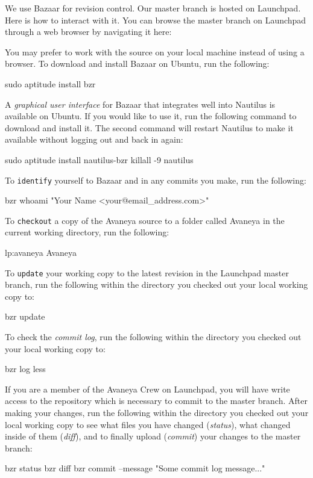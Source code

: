 
We use Bazaar for revision control. Our master branch is hosted on Launchpad. Here is how to interact with it. You can browse the master branch on Launchpad through a web browser by navigating it here:


You may prefer to work with the source on your local machine instead of using a browser. To download and install Bazaar on Ubuntu, run the following:

\StartCodeExample
\type{$} sudo aptitude install
\type{$} bzr
\StopCodeExample

A {\it graphical user interface} for Bazaar that integrates well into Nautilus is available on Ubuntu. If you would like to use it, run the following command to download and install it. The second command will restart Nautilus to make it available without logging out and back in again:

\StartCodeExample
\type{$} sudo aptitude install nautilus-bzr
\type{$} killall -9 nautilus
\StopCodeExample

To {\tt identify} yourself to Bazaar and in any commits you make, run the following:

\StartCodeExample
\type{$} bzr whoami "Your Name <your@email_address.com>"
\StopCodeExample

To {\tt checkout} a copy of the Avaneya source to a folder called Avaneya in the current working directory, run the following:

\StartCodeExample
\type{$} lp:avaneya Avaneya
\StopCodeExample

To {\tt update} your working copy to the latest revision in the Launchpad master branch, run the following within the directory you checked out your local working copy to:

\StartCodeExample
\type{$} bzr update
\StopCodeExample

To check the {\it commit log}, run the following within the directory you checked out your local working copy to:

\StartCodeExample
\type{$} bzr log \type{|} less
\StopCodeExample

If you are a member of the Avaneya Crew on Launchpad, you will have write access to the repository which is necessary to commit to the master branch. After making your changes, run the following within the directory you checked out your local working copy to see what files you have changed ({\it status}), what changed inside of them ({\it diff}), and to finally upload ({\it commit}) your changes to the master branch:

\StartCodeExample
\type{$} bzr status
\type{$} bzr diff
\type{$} bzr commit --message "Some commit log message..."
\StopCodeExample

